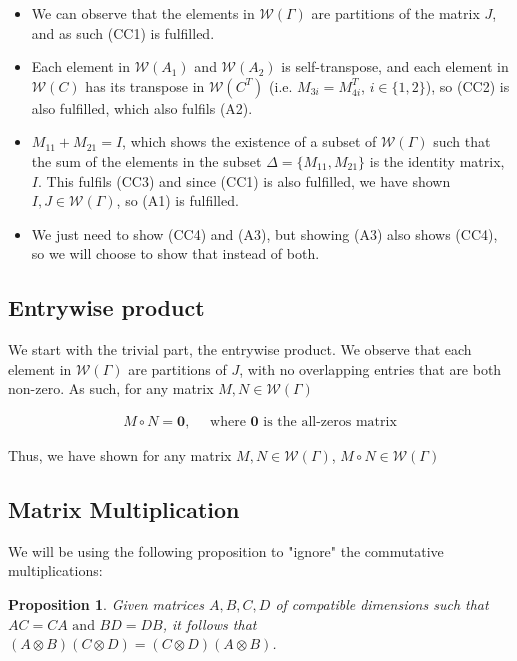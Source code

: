 \documentclass{article}
\newtheorem{proposition}{Proposition}
\begin{document}
\begin{itemize}
    \item We can observe that the elements in $\mathcal{W}(\Gamma)$ are partitions of the matrix $J$, and as such (CC1) is fulfilled.
    \item Each element in $\mathcal{W}(A_1)$ and $\mathcal{W}(A_2)$ is self-transpose, and each element in $\mathcal{W}(C)$ has its transpose in $\mathcal{W}(C^T)$ (i.e. $M_{3i} = M_{4i}^T$, $i \in\{1,2\}$), so (CC2) is also fulfilled, which also fulfils (A2).
    \item $M_{11} + M_{21} = I$, which shows the existence of a subset of $\mathcal{W}(\Gamma)$ such that the sum of the elements in the subset $\Delta = \{M_{11}, M_{21}\}$ is the identity matrix, $I$. This fulfils (CC3) and since (CC1) is also fulfilled, we have shown $I,J \in \mathcal{W}(\Gamma)$, so (A1) is fulfilled. 
    \item We just need to show (CC4) and (A3), but showing (A3) also shows (CC4), so we will choose to show that instead of both.
\end{itemize}

\subsection{Entrywise product} 
We start with the trivial part, the entrywise product. We observe that each element in $\mathcal{W}(\Gamma)$ are partitions of $J$, with no overlapping entries that are both non-zero. As such, for any matrix $M,N \in \mathcal{W}(\Gamma)$

\begin{align*}
    M\circ N = \mathbf{0}, \quad\text{ where } \mathbf{0} \text{ is the all-zeros matrix}
\end{align*}

Thus, we have shown for any matrix $M,N \in \mathcal{W}(\Gamma)$, $M\circ N \in \mathcal{W}(\Gamma)$

\subsection{Matrix Multiplication}

We will be using the following proposition to "ignore" the commutative multiplications:

\begin{proposition}\label{prop:commutative_kronecker}
    Given matrices $A,B,C,D$ of compatible dimensions such that $AC=CA \text{ and } BD=DB$, it follows that $(A \otimes B)(C \otimes D) = (C\otimes D)(A\otimes B)$.
\end{proposition}
\end{document}
